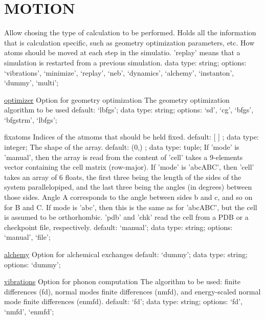 \section{MOTION}
\label{MOTION}
\begin{ipifield}{}%
{Allow chosing the type of calculation to be performed. Holds all the information that is calculation specific, such as geometry optimization parameters, etc.}%
{}%
{%
{How atoms should be moved at each step in the simulatio. 'replay' means that a simulation is restarted from a previous simulation.}%
{data type: string; options: `vibrations', `minimize', `replay', `neb', `dynamics', `alchemy', `instanton', `dummy', `multi'; }%
}
\begin{ipifield}{\hyperref[GEOP]{optimizer}}%
{Option for geometry optimization}%
{}%
{%
{The geometry optimization algorithm to be used}%
{default: `lbfgs'; data type: string; options: `sd', `cg', `bfgs', `bfgstrm', `lbfgs'; }%
}
\end{ipifield}
\begin{ipifield}{fixatoms}%
{Indices of the atmoms that should be held fixed.}%
{default:  [ ] ; data type: integer; }%
{%
{The shape of the array.}%
{default:  (0,) ; data type: tuple; }%
%
{If 'mode' is 'manual', then the array is read from the content of 'cell' takes a 9-elements vector containing the cell matrix (row-major). If 'mode' is 'abcABC', then 'cell' takes an array of 6 floats, the first three being the length of the sides of the system parallelopiped, and the last three being the angles (in degrees) between those sides. Angle A corresponds to the angle between sides b and c, and so on for B and C. If mode is 'abc', then this is the same as for 'abcABC', but the cell is assumed to be orthorhombic. 'pdb' and 'chk' read the cell from a PDB or a checkpoint file, respectively.}%
{default: `manual'; data type: string; options: `manual', `file'; }%
}
\end{ipifield}
\begin{ipifield}{\hyperref[ALCHEMY]{alchemy}}%
{Option for alchemical exchanges}%
{}%
{%
{ }%
{default: `dummy'; data type: string; options: `dummy'; }%
}
\end{ipifield}
\begin{ipifield}{\hyperref[PHONONS]{vibrations}}%
{Option for phonon computation}%
{}%
{%
{The algorithm to be used: finite differences (fd), normal modes finite differences (nmfd), and energy-scaled normal mode finite differences (enmfd).}%
{default: `fd'; data type: string; options: `fd', `nmfd', `enmfd'; }%
}
\end{ipifield}
\end{ipifield}
